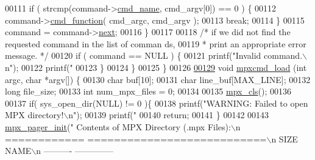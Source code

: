\begin{DoxyCode}
{{{00111                         \textcolor{keywordflow}{if} ( strcmp(command->\hyperlink{structmpx__cmd_aeae73296151ffcec319820f4d8399e51}{cmd_name}, cmd\_argv[0]) == 0 ) \{
00112                                 command->\hyperlink{structmpx__cmd_ad35d459cc43aac3f75fb308e07572253}{cmd_function}( cmd\_argc, cmd\_argv );
00113                                 \textcolor{keywordflow}{break};
00114                         \}
00115                         command = command->\hyperlink{structmpx__cmd_a863c991d0d31b283791615b5f5fe03bb}{next};
00116                 \}
00117 
00118                 \textcolor{comment}{/* if we did not find the requested command in the list of comman
      ds,}
00119 \textcolor{comment}{                 * print an appropriate error message. */}
00120                 \textcolor{keywordflow}{if} ( command == NULL ) \{
00121                          printf(\textcolor{stringliteral}{"Invalid command.\(\backslash\)n"});
00122                          printf(\textcolor{stringliteral}{"%
00123                 \}
00124         \}
00125 \}
00126 
\hypertarget{mpx__cmd_8c_source_l00129}{}\hyperlink{mpx__cmd_8h_ab121952706478a3ce5951ab91298d391}{00129} \textcolor{keywordtype}{void} \hyperlink{mpx__cmd_8c_ab121952706478a3ce5951ab91298d391}{mpxcmd_load} (\textcolor{keywordtype}{int} argc, \textcolor{keywordtype}{char} *argv[]) \{
00130         \textcolor{keywordtype}{char} buf[10];
00131         \textcolor{keywordtype}{char} line\_buf[MAX\_LINE];
00132         \textcolor{keywordtype}{long} file\_size;
00133         \textcolor{keywordtype}{int}  num\_mpx\_files = 0;
00134 
00135         \hyperlink{mpx__util_8c_a8cf3281978ba1652fd5d643e1a41f70b}{mpx_cls}();
00136 
00137         \textcolor{keywordflow}{if}( sys\_open\_dir(NULL) != 0 )\{
00138                 printf(\textcolor{stringliteral}{"WARNING: Failed to open MPX directory!\(\backslash\)n"});
00139                 printf(\textcolor{stringliteral}{"%
00140                 \textcolor{keywordflow}{return};
00141         \}
00142 
00143         \hyperlink{mpx__util_8c_a60afdb7496b6ff469c6b98d2ecde15ed}{mpx_pager_init}(\textcolor{stringliteral}{"  Contents of MPX Directory (.mpx Files):\(\backslash\)n  ============
      ===========================\(\backslash\)n    SIZE        NAME\(\backslash\)n    ----------  --------------
}}}}}}
\end{DoxyCode}
